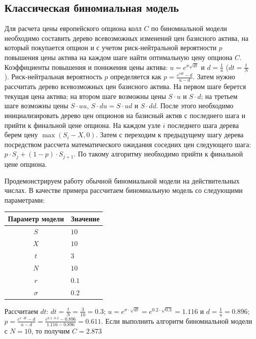 \documentclass[a4paper,12pt]{extarticle} %
\begin{document}
	\subsection{Классическая биномиальная модель}
	Для расчета цены европейского опциона колл $C$ по биномиальной модели необходимо составить дерево всевозможных изменений цен базисного актива, на который покупается опцион и с учетом риск-нейтральной вероятности $p$ повышения цены актива на каждом шаге найти оптимальную цену опциона $C$. Коэффициенты повышения и понижения цены актива: $u=e^{\sigma \sqrt{dt}}$ и $d=\frac{1}{u}$ ($dt = \frac{t}{N}$). Риск-нейтральная вероятность $p$ определяется как $p=\frac{e^{r dt}-d}{u-d}$. Затем нужно рассчитать дерево всевозможных цен базисного актива. На первом шаге берется текущая цена актива; на втором шаге возможны цены $S \cdot u$ и $S \cdot d$; на третьем шаге возможны цены $S \cdot uu$, $S \cdot du=S \cdot ud$ и $S \cdot dd$. После этого необходимо инициализировать дерево цен опционов на базисный актив с последнего шага и прийти к финальной цене опциона. На каждом узле $i$ последнего шага дерева берем цену $\max{(S_i-X, 0)}$. Затем с переходим к предыдущему шагу дерева посредством рассчета математического ожидания соседних цен следующего шага: $p \cdot S_{j} + (1-p) \cdot S_{j+1}$. По такому алгоритму необходимо прийти к финальной цене опциона. 
	
	Продемонстрируем работу обычной биномиальной модели на действительных числах. В качестве примера рассчитаем биномиальную модель со следующими параметрами:
	\begin{center}
		\begin{tabular}{|c|l|}
			\hline
			\textbf{Параметр модели} & \textbf{Значение} \\
			\hline
			$S$ & $10$ \\
			$X$ & $10$ \\
			$t$ & $3$ \\
			$N$ & $10$ \\
			$r$ & $0.1$ \\
			$\sigma$ & $0.2$ \\
			\hline
		\end{tabular}
	\end{center}
	
	Рассчитаем $dt$: $dt = \frac{t}{N}=\frac{3}{10}=0.3$; $u=e^{\sigma \cdot \sqrt{dt}}=e^{0.2 \cdot \sqrt{0.3}}=1.116$ и $d=\frac{1}{u}=0.896$; $p=\frac{e^{r \cdot dt}-d}{u-d}=\frac{e^{0.1 \cdot 0.3}-0.896}{1.116-0.896}=0.611$. Если выполнить алгоритм биномиальной модели с $N=10$, то получим $C=2.873$
	
\end{document}
